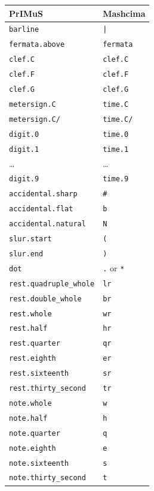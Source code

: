 \begin{table}[p] \centering
\begin{tabular}{ll}
\toprule
\textbf{PrIMuS} & \textbf{Mashcima} \\
\midrule
\verb`barline` & \verb`|` \\
\verb`fermata.above` & \verb`fermata` \\
\midrule
\verb`clef.C` & \verb`clef.C` \\
\verb`clef.F` & \verb`clef.F` \\
\verb`clef.G` & \verb`clef.G` \\
\midrule
\verb`metersign.C` & \verb`time.C` \\
\verb`metersign.C/` & \verb`time.C/` \\
\verb`digit.0` & \verb`time.0` \\
\verb`digit.1` & \verb`time.1` \\
\ldots & \ldots \\
\verb`digit.9` & \verb`time.9` \\
\midrule
\verb`accidental.sharp` & \verb`#` \\
\verb`accidental.flat` & \verb`b` \\
\verb`accidental.natural` & \verb`N` \\
\midrule
\verb`slur.start` & \verb`(` \\
\verb`slur.end` & \verb`)` \\
\verb`dot` & \verb`.` or \verb`*` \\
\midrule
\verb`rest.quadruple_whole` & \verb`lr` \\
\verb`rest.double_whole` & \verb`br` \\
\verb`rest.whole` & \verb`wr` \\
\verb`rest.half` & \verb`hr` \\
\verb`rest.quarter` & \verb`qr` \\
\verb`rest.eighth` & \verb`er` \\
\verb`rest.sixteenth` & \verb`sr` \\
\verb`rest.thirty_second` & \verb`tr` \\
\midrule
\verb`note.whole` & \verb`w` \\
\verb`note.half` & \verb`h` \\
\verb`note.quarter` & \verb`q` \\
\verb`note.eighth` & \verb`e` \\
\verb`note.sixteenth` & \verb`s` \\
\verb`note.thirty_second` & \verb`t` \\

\end{tabular}
\end{table}
